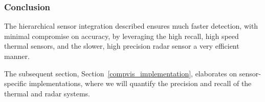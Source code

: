 






\subsubsection{Conclusion} 
The hierarchical sensor integration described ensures much faster detection, with minimal compromise on accuracy, by leveraging the high recall, high speed thermal sensors, and the slower, high precision radar sensor a very efficient manner.

The subsequent section, Section~\ref{compvis_implementation}, elaborates on sensor-specific implementations, where we will quantify the precision and recall of the thermal and radar systems.